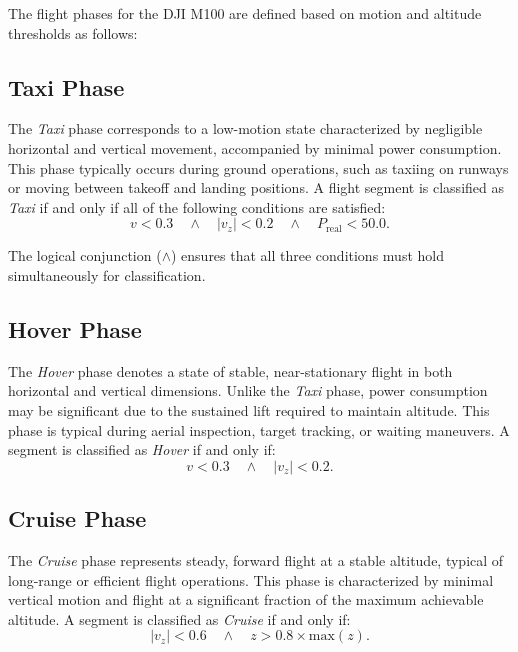 The flight phases for the DJI M100 are defined based on motion and altitude thresholds as follows:

\subsection{Taxi Phase}
The \textit{Taxi} phase corresponds to a low-motion state characterized by negligible horizontal and vertical movement, accompanied by minimal power consumption. This phase typically occurs during ground operations, such as taxiing on runways or moving between takeoff and landing positions. A flight segment is classified as \textit{Taxi} if and only if all of the following conditions are satisfied:
\begin{equation}
v < 0.3 \quad \land \quad \left| v_z \right| < 0.2 \quad \land \quad P_\text{real} < 50.0.    
\end{equation}

The logical conjunction ($\land$) ensures that all three conditions must hold simultaneously for classification.

\subsection{Hover Phase}
The \textit{Hover} phase denotes a state of stable, near-stationary flight in both horizontal and vertical dimensions. Unlike the \textit{Taxi} phase, power consumption may be significant due to the sustained lift required to maintain altitude. This phase is typical during aerial inspection, target tracking, or waiting maneuvers. A segment is classified as \textit{Hover} if and only if:
\begin{equation}
v < 0.3 \quad \land \quad \left| v_z \right| < 0.2.
\end{equation}

\subsection{Cruise Phase}
The \textit{Cruise} phase represents steady, forward flight at a stable altitude, typical of long-range or efficient flight operations. This phase is characterized by minimal vertical motion and flight at a significant fraction of the maximum achievable altitude. A segment is classified as \textit{Cruise} if and only if:
\begin{equation}
\left| v_z \right| < 0.6 \quad \land \quad z > 0.8 \times \text{max}(z).    
\end{equation}

